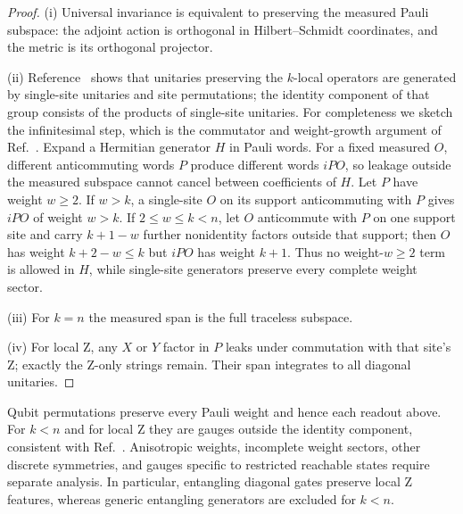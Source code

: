 \begin{proof}
(i) Universal invariance is equivalent to preserving the measured Pauli
subspace: the adjoint action is orthogonal in Hilbert--Schmidt
coordinates, and the metric is its orthogonal projector.

(ii) Reference~\cite{cpr2019locality} shows that unitaries preserving
the $k$-local operators are generated by single-site unitaries and site
permutations; the identity component of that group consists of the
products of single-site unitaries. For completeness we sketch the
infinitesimal step, which is the commutator and weight-growth argument
of Ref.~\cite{cpr2019locality}. Expand a Hermitian generator $H$ in
Pauli words. For a fixed measured $O$, different anticommuting words
$P$ produce different words $iPO$, so leakage outside the measured
subspace cannot cancel between coefficients of $H$. Let $P$ have weight
$w\ge2$. If $w>k$, a single-site $O$ on its support anticommuting with
$P$ gives $iPO$ of weight $w>k$. If $2\le w\le k<n$, let $O$
anticommute with $P$ on one support site and carry $k+1-w$ further
nonidentity factors outside that support; then $O$ has weight
$k+2-w\le k$ but $iPO$ has weight $k+1$. Thus no weight-$w\ge2$ term
is allowed in $H$, while single-site generators preserve every complete
weight sector.

(iii) For $k=n$ the measured span is the full traceless subspace.

(iv) For local Z, any $X$ or $Y$ factor in $P$ leaks under commutation
with that site's Z; exactly the Z-only strings remain. Their span
integrates to all diagonal unitaries.
\end{proof}
Qubit permutations preserve every Pauli weight and hence each readout
above. For $k<n$ and for local Z they are gauges outside the identity
component, consistent with Ref.~\cite{cpr2019locality}. Anisotropic
weights, incomplete weight sectors, other discrete symmetries, and
gauges specific to restricted reachable states require separate
analysis. In particular, entangling diagonal gates preserve local Z
features, whereas generic entangling generators are excluded for $k<n$.
